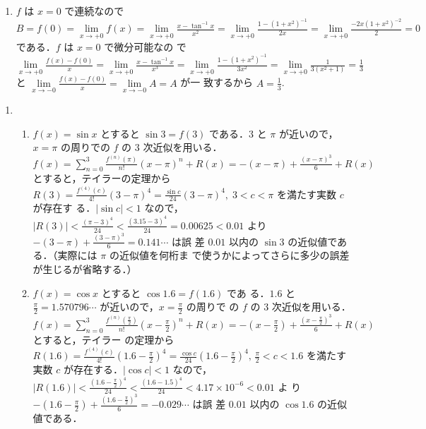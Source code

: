\documentclass[11pt, uplatex, dvipdfmx, twoside]{jsarticle}
\newcommand{\ds}{\displaystyle}
\renewcommand{\dlim}{\lim\limits} %
\begin{document}
\begin{enumerate}[label=\ref{sec:hospital}.\arabic*]
\begin{enumerate}[label=(\arabic*)]
  \item $f$ は $x=0$ で連続なので
    $B=f(0) = \dlim_{x \to +0} f(x) = \dlim_{x \to +0}
    \frac{x-\tan^{-1}x}{x^2} = \dlim_{x \to +0}
    \frac{1-(1+x^2)^{-1}}{2x} = \dlim_{x \to +0}
    \frac{-2x(1+x^2)^{-2}}{2}=0$ である．$f$ は $x=0$ で微分可能なの
    で
    $\dlim_{x \to +0}\frac{f(x)-f(0)}{x} = \dlim_{x \to +0}
    \frac{x-\tan^{-1}x}{x^3} = \dlim_{x \to +0}
    \frac{1-(1+x^2)^{-1}}{3x^2}= \dlim_{x \to
      +0}\frac{1}{3(x^2+1)}=\frac{1}{3}$ と
    $\dlim_{x \to -0} \frac{f(x)-f(0)}{x} = \dlim_{x \to -0} A=A$ が一
    致するから $A=\frac{1}{3}$.
    
  \end{enumerate}
\end{enumerate}

\newpage

\begin{enumerate}[label=\ref{sec:taylor}.\arabic*]
  \setlength{\itemsep}{1ex}
  
\item
  \begin{enumerate}[label=(\arabic*)]

    \setlength{\itemsep}{1ex}
    
  \item $f(x) = \sin x$ とすると $\sin 3 = f(3)$ である．$3$ と $\pi$
    が近いので，$x=\pi$ の周りでの $f$ の $3$
    次近似を用いる．$f(x) = {\ds \sum_{n=0}^{3}}
    \frac{f^{(n)}(\pi)}{n!} (x-\pi)^n +R(x)= -(x-\pi) +
    \frac{(x-\pi)^3}{6} + R(x)$ とすると，テイラーの定理から
    $R(3) = \frac{f^{(4)}(c)}{4!}(3-\pi)^4 = \frac{\sin
      c}{24}(3-\pi)^4, \; 3 < c < \pi$ を満たす実数 $c$ が存在す
    る．$|\sin c| <1$
    なので，$|R(3)| < \frac{(\pi-3)^4}{24}<
    \frac{(3.15-3)^4}{24}=0.00625 < 0.01$
    より $-(3-\pi) + \frac{(3-\pi)^3}{6} = 0.141\cdots$ は誤
    差 $0.01$ 以内の $\sin 3$ の近似値である．（実際には $\pi$ の近似値を何桁ま
    で使うかによってさらに多少の誤差が生じるが省略する．）

  \item $f(x) = \cos x$ とすると $\cos 1.6 = f(1.6)$ であ
    る．$1.6$ と $\frac{\pi}{2}=1.570796\cdots $ が近いので，$x=\frac{\pi}{2}$ の周りで
    の $f$ の $3$
    次近似を用いる．$f(x) = {\ds \sum_{n=0}^{3}}
    \frac{f^{(n)}\left(\frac{\pi}{2}\right)}{n!}\left(x-\frac{\pi}{2}\right)^n + R(x) =
    -\left(x-\frac{\pi}{2}\right) +
    \frac{\left(x-\frac{\pi}{2}\right)^3}{6} + R(x)$ とすると，テイラー
    の定理から
    $R(1.6) = \frac{f^{(4)}(c)}{4!}\left(1.6-\frac{\pi}{2}\right)^4 =
    \frac{ \cos c}{24}\left( 1.6-\frac{\pi}{2}\right)^4 , \,
    \frac{\pi}{2} < c < 1.6$ を満たす実数 $c$ が存在する．$|\cos c|
    <1$
    なので，$|R(1.6)| < \frac{\left(1.6 - \frac{\pi}{2}\right)^4}{24}
    < \frac{(1.6-1.5)^4}{24} < 4.17 \times 10^{-6} < 0.01$ よ
    り $-\left(1.6-\frac{\pi}{2}\right) +
    \frac{\left(1.6-\frac{\pi}{2}\right)^3}{6} =-0.029\cdots$ は誤
    差 $0.01$ 以内の $\cos 1.6$ の近似値である．


\end{enumerate}
\end{enumerate}
\end{document}
